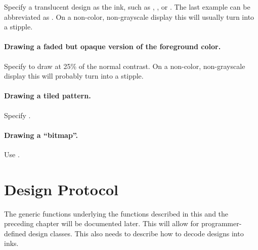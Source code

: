 Specify a translucent design as the ink, such as , , or
.  The last example
can be abbreviated as .  On a non-color,
non-grayscale display this will usually turn into a stipple.

\paragraph {Drawing a faded but opaque version of the foreground color.}

Specify  to draw at 25\% of the normal contrast.  On a non-color,
non-grayscale display this will probably turn into a stipple.

\paragraph {Drawing a tiled pattern.}

Specify .

\paragraph {Drawing a ``bitmap''.}

Use .


\section {Design Protocol}

 {The generic functions underlying the functions described in this
and the preceding chapter will be documented later.  This will allow for
programmer-defined design classes.  This also needs to describe how to decode
designs into inks.}
